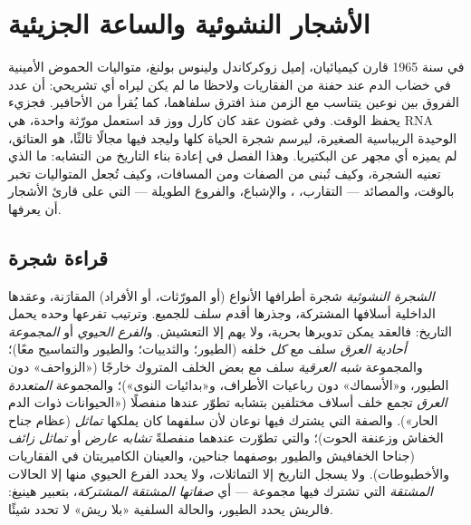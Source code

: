 \chapter{الأشجار النشوئية والساعة الجزيئية}\label{ch:b2:phylogenetic-trees}

في سنة 1965 قارن كيميائيان، إميل زوكركاندل ولينوس بولنغ،
متواليات الحموض الأمينية في خضاب الدم عند حفنة من
الفقاريات ولاحظا ما لم يكن ليراه أي تشريحي:
أن عدد الفروق بين نوعين يتناسب مع
الزمن منذ افترق سلفاهما، كما يُقرأ من الأحافير.
فجزيء يحفظ الوقت. وفي غضون عقد كان كارل ووز قد استعمل مورّثة واحدة،
هي RNA الوحيدة الريباسية الصغيرة، ليرسم شجرة الحياة
كلها وليجد فيها مجالًا ثالثًا، هو العتائق، لم يميزه
أي مجهر عن البكتيريا. وهذا الفصل في
إعادة بناء التاريخ من التشابه: ما الذي تعنيه الشجرة، وكيف تُبنى
من الصفات ومن المسافات، وكيف تُجعل المتواليات
تخبر بالوقت، والمصائد --- التقارب، ،
والإشباع، والفروع الطويلة --- التي على قارئ الأشجار أن يعرفها.

\section{قراءة شجرة}

\begin{definition}\label{def:b2:phylogenetic-trees:tree}
\emph{الشجرة النشوئية} شجرة أطرافها الأنواع (أو المورّثات،
أو الأفراد) المقارَنة، وعقدها الداخلية أسلافها
المشتركة، وجذرها أقدم سلف للجميع. وترتيب
تفرعها وحده يحمل التاريخ: فالعقد يمكن تدويرها
بحرية، ولا يهم إلا التعشيش. و\emph{الفرع الحيوي} أو
\emph{المجموعة أحادية العرق} سلف مع \emph{كل} خلفه
(الطيور؛ والثدييات؛ والطيور والتماسيح معًا)؛
والمجموعة \emph{شبه العرقية} سلف مع بعض الخلف
المتروك خارجًا («الزواحف» دون الطيور، و«الأسماك» دون رباعيات الأطراف،
و«بدائيات النوى»)؛ والمجموعة \emph{المتعددة العرق} تجمع خلف
أسلاف مختلفين بتشابه تطوّر عندها منفصلًا
(«الحيوانات ذوات الدم الحار»). والصفة التي يشترك فيها نوعان
لأن سلفهما كان يملكها \emph{تماثل} (عظام
جناح الخفاش وزعنفة الحوت)؛ والتي تطوّرت عندهما
منفصلةً \emph{تشابه عارض} أو \emph{تماثل زائف} (جناحا
الخفافيش والطيور بوصفهما جناحين، والعينان الكاميريتان في الفقاريات
والأخطبوطات). ولا يسجل التاريخ إلا التماثلات، ولا يحدد الفرع الحيوي
منها إلا الحالات \emph{المشتقة} التي تشترك فيها مجموعة --- أي
\emph{صفاتها المشتقة المشتركة}، بتعبير هينيغ: فالريش
يحدد الطيور، والحالة السلفية «بلا ريش» لا تحدد شيئًا.
\end{definition}

